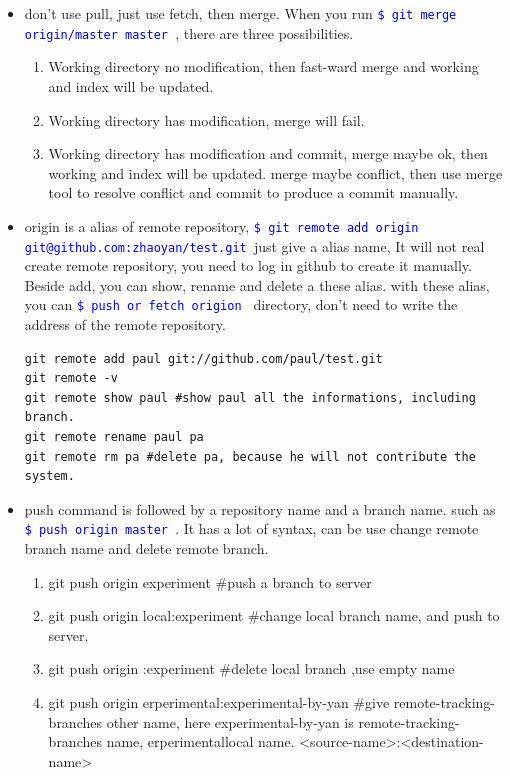\documentclass[a4paper,11pt,twoside]{book}
\newcommand{\linuxcommand}[1]{\texttt{\textcolor{blue}{\$ #1 \Pisymbol{psy}{191}}}}
\begin{document}
\begin{itemize}
\item don't use pull, just use fetch, then merge.  When you run \linuxcommand{git merge origin/master master}, there are three possibilities. 
		\begin{enumerate}
				\item Working directory no modification, then fast-ward merge and working and index will be updated. 
				\item Working directory has modification, merge will fail. 
				\item Working directory has modification and commit, merge maybe ok, then working and index will be updated. merge maybe conflict, then use merge tool to resolve conflict and commit to produce a commit manually.
		\end{enumerate}

\item origin is a alias of remote repository,  \linuxcommand{git remote add origin git@github.com:zhaoyan/test.git}just give a alias name, It will not real create remote repository, you need to log in github to create it manually.  Beside add, you can show, rename and delete a these alias. with these alias, you can \linuxcommand{push or fetch origion} directory, don't need to write the address of the remote repository.

\begin{verbatim}
git remote add paul git://github.com/paul/test.git
git remote -v
git remote show paul #show paul all the informations, including branch.
git remote rename paul pa
git remote rm pa #delete pa, because he will not contribute the system.
\end{verbatim}

\item push command is followed by a repository name and a branch name.  such as \linuxcommand{push origin master}. It has a lot of syntax, can be use change remote branch name and delete remote branch.
\begin{enumerate}
\item git push origin experiment \#push a branch to server
\item git push origin local:experiment \#change local branch name, and push to server. 
\item git push origin :experiment \#delete local branch ,use empty name 
\item git push origin erperimental:experimental-by-yan \#give remote-tracking-branches other name, here experimental-by-yan is remote-tracking-branches name, erperimentallocal name. <source-name>:<destination-name>
\end{enumerate}

\end{itemize}
\end{document}
